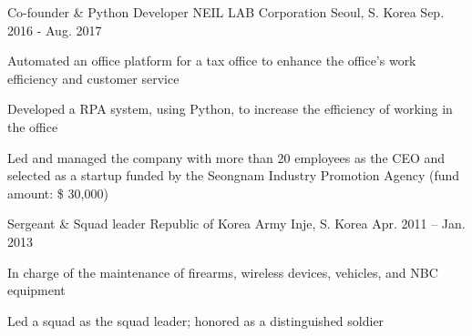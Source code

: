 


\begin{cventries}


\cventry
{Co-founder \& Python Developer} %
{NEIL LAB Corporation} %
{Seoul, S. Korea} %
{Sep. 2016 - Aug. 2017} %
{ %
\begin{cvitems}
\item {Automated an office platform for a tax office to enhance the office’s work efficiency and customer service}
\item {Developed a RPA system, using Python, to increase the efficiency of working in the office}
\item {Led and managed the company with more than 20 employees as the CEO and selected as a startup funded by the Seongnam Industry Promotion Agency (fund amount: \$ 30,000)}
\end{cvitems}
}


\cventry
{Sergeant \& Squad leader} %
{Republic of Korea Army} %
{Inje, S. Korea} %
{Apr. 2011 – Jan. 2013} %
{ %
\begin{cvitems}
\item {In charge of the maintenance of firearms, wireless devices, vehicles, and NBC equipment}
\item {Led a squad as the squad leader; honored as a distinguished soldier}
\end{cvitems}
}



\end{cventries}